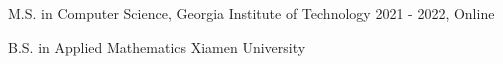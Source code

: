 


\begin{cventries}


%


\verycompactcventry
{M.S. in Computer Science, Georgia Institute of Technology} %
{2021 - 2022, Online} %

\verycompactcventry
{B.S. in Applied Mathematics} %
{Xiamen University} %

\end{cventries}